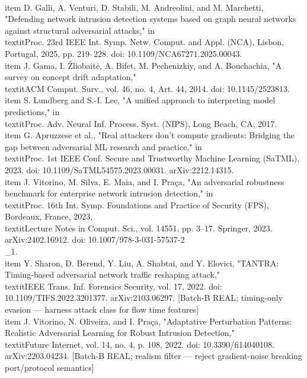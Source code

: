 \documentclass[12pt,a4paper,oneside]{report}
\begin{document}
\\item D. Galli, A. Venturi, D. Stabili, M. Andreolini, and M. Marchetti, "Defending network intrusion detection systems based on graph neural networks against structural adversarial attacks," in \\textit{Proc. 23rd IEEE Int. Symp. Netw. Comput. and Appl. (NCA)}, Lisbon, Portugal, 2025, pp. 219–228. doi: 10.1109/NCA67271.2025.00043.
\\item J. Gama, I. Žliobaitė, A. Bifet, M. Pechenizkiy, and A. Bouchachia, "A survey on concept drift adaptation," \\textit{ACM Comput. Surv.}, vol. 46, no. 4, Art. 44, 2014. doi: 10.1145/2523813.
\\item S. Lundberg and S.-I. Lee, "A unified approach to interpreting model predictions," in \\textit{Proc. Adv. Neural Inf. Process. Syst. (NIPS)}, Long Beach, CA, 2017.
\\item G. Apruzzese et al., "Real attackers don't compute gradients: Bridging the gap between adversarial ML research and practice," in \\textit{Proc. 1st IEEE Conf. Secure and Trustworthy Machine Learning (SaTML)}, 2023. doi: 10.1109/SaTML54575.2023.00031. arXiv:2212.14315.
\\item J. Vitorino, M. Silva, E. Maia, and I. Praça, "An adversarial robustness benchmark for enterprise network intrusion detection," in \\textit{Proc. 16th Int. Symp. Foundations and Practice of Security (FPS)}, Bordeaux, France, 2023, \\textit{Lecture Notes in Comput. Sci.}, vol. 14551, pp. 3–17. Springer, 2023. arXiv:2402.16912. doi: 10.1007/978-3-031-57537-2\\_1.
\\item Y. Sharon, D. Berend, Y. Liu, A. Shabtai, and Y. Elovici, "TANTRA: Timing-based adversarial network traffic reshaping attack," \\textit{IEEE Trans. Inf. Forensics Security}, vol. 17, 2022. doi: 10.1109/TIFS.2022.3201377. arXiv:2103.06297. [Batch-B REAL; timing-only evasion — harness attack class for flow time features]
\\item J. Vitorino, N. Oliveira, and I. Praça, "Adaptative Perturbation Patterns: Realistic Adversarial Learning for Robust Intrusion Detection," \\textit{Future Internet}, vol. 14, no. 4, p. 108, 2022. doi: 10.3390/fi14040108. arXiv:2203.04234. [Batch-B REAL; realism filter — reject gradient-noise breaking port/protocol semantics]
\end{document}
